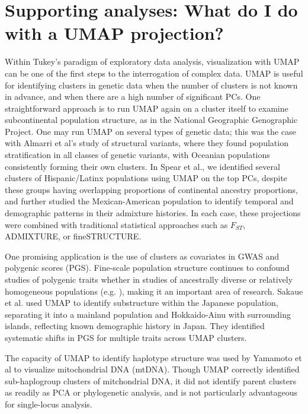 \section{Supporting analyses: What do I do with a UMAP projection?}
Within Tukey's paradigm of exploratory data analysis, visualization with UMAP can be one of the first steps to the interrogation of complex data\citep{holmes_modern_2019}. UMAP is useful for identifying clusters in genetic data when the number of clusters is not known in advance\citep{tonkin-hill_fast_2019}, and when there are a high number of significant PCs\citep{diaz-papkovich_umap_2019}. One straightforward approach is to run UMAP again on a cluster itself to examine subcontinental population structure, as in the National Geographic Genographic Project\citep{dai_population_2020}. One may run UMAP on several types of genetic data; this was the case with Almarri et al's study of structural variants, where they found population stratification in all classes of genetic variants, with Oceanian populations consistently forming their own clusters\citep{almarri2020population}. In Spear et al., we identified several clusters of Hispanic/Latinx populations using UMAP on the top PCs, despite these groups having overlapping proportions of continental ancestry proportions, and further studied the Mexican-American population to identify temporal and demographic patterns in their admixture histories\citep{spear2020recent}. In each case, these projections were combined with traditional statistical approaches such as $F_{ST}$, ADMIXTURE\citep{alexander2009fast}, or fineSTRUCTURE\citep{lawson2012inference}.

One promising application is the use of clusters as covariates in GWAS and polygenic scores (PGS). Fine-scale population structure continues to confound studies of polygenic traits whether in studies of ancestrally diverse or relatively homogeneous populations (e.g. \citep{kerminen_geographic_2019,berg_reduced_2019,sohail2019polygenic}), making it an important area of research. Sakaue et al. used UMAP to identify substructure within the Japanese population, separating it into a mainland population and Hokkaido-Ainu with surrounding islands, reflecting known demographic history in Japan\citep{sakaue_dimensionality_2020}. They identified systematic shifts in PGS for multiple traits across UMAP clusters.

The capacity of UMAP to identify haplotype structure was used by Yamamoto et al to visualize mitochondrial DNA (mtDNA). Though UMAP correctly identified sub-haplogroup clusters of mitchondrial DNA, it did not identify parent clusters as readily as PCA or phylogenetic analysis, and is not particularly advantageous for single-locus analysis\citep{yamamoto_genetic_2020}. 

